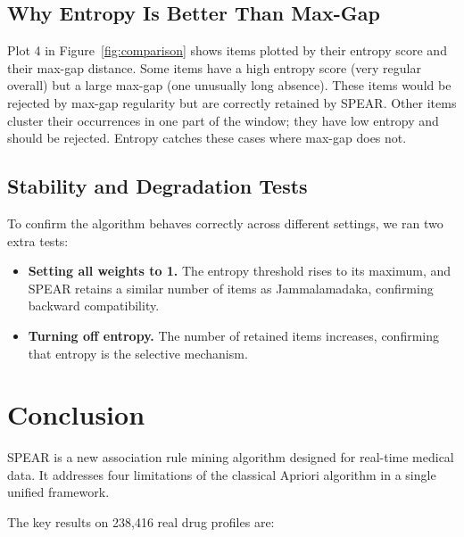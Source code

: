\documentclass[10pt,twocolumn]{article}
\begin{document}
\subsection{Why Entropy Is Better Than Max-Gap}

Plot 4 in Figure~\ref{fig:comparison} shows items plotted by their
entropy score and their max-gap distance.
Some items have a high entropy score (very regular overall) but a
large max-gap (one unusually long absence). These items would be
rejected by max-gap regularity but are correctly retained by SPEAR.
Other items cluster their occurrences in one part of the window; they
have low entropy and should be rejected. Entropy catches these cases
where max-gap does not.

\subsection{Stability and Degradation Tests}

To confirm the algorithm behaves correctly across different
settings, we ran two extra tests:

\begin{itemize}[leftmargin=*]
  \item \textbf{Setting all weights to 1.} The entropy threshold
        rises to its maximum, and SPEAR retains a similar number of
        items as Jammalamadaka, confirming backward compatibility.
  \item \textbf{Turning off entropy.} The number of retained items
        increases, confirming that entropy is the selective mechanism.
\end{itemize}

\section{Conclusion}
\label{sec:conclusion}

SPEAR is a new association rule mining algorithm designed for
real-time medical data. It addresses four limitations of the
classical Apriori algorithm in a single unified framework.

The key results on 238{,}416 real drug profiles are:
\end{document}
